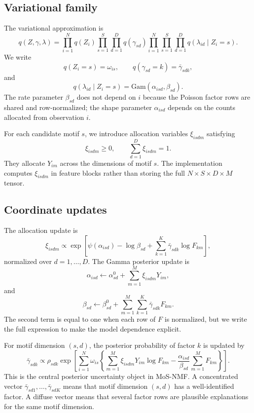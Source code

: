 \documentclass[11pt]{article}
\newcommand{\Gam}{\mathrm{Gam}}
\theoremstyle{definition}
\begin{document}
\subsection{Variational family}

The variational approximation is
\[
  q(Z,\gamma,\lambda)
  =
  \prod_{i=1}^N q(Z_i)
  \prod_{s=1}^S\prod_{d=1}^D q(\gamma_{sd})
  \prod_{i=1}^N\prod_{s=1}^S\prod_{d=1}^D
  q(\lambda_{id}\mid Z_i=s).
\]
We write
\[
  q(Z_i=s)=\omega_{is},
  \qquad
  q(\gamma_{sd}=k)=\bar{\gamma}_{sdk},
\]
and
\[
  q(\lambda_{id}\mid Z_i=s)
  =
  \Gam(\alpha_{isd},\beta_{sd}).
\]
The rate parameter $\beta_{sd}$ does not depend on $i$ because the Poisson
factor rows are shared and row-normalized; the shape parameter
$\alpha_{isd}$ depends on the counts allocated from observation $i$.

For each candidate motif $s$, we introduce allocation variables
$\xi_{isdm}$ satisfying
\[
  \xi_{isdm}\geq 0,
  \qquad
  \sum_{d=1}^D \xi_{isdm}=1.
\]
They allocate $Y_{im}$ across the dimensions of motif $s$. The implementation
computes $\xi_{isdm}$ in feature blocks rather than storing the full
$N\times S\times D\times M$ tensor.

\subsection{Coordinate updates}

The allocation update is
\[
  \xi_{isdm}
  \propto
  \exp\left[
    \psi(\alpha_{isd})-\log\beta_{sd}
    +
    \sum_{k=1}^K \bar{\gamma}_{sdk}\log F_{km}
  \right],
\]
normalized over $d=1,\ldots,D$. The Gamma posterior update is
\[
  \alpha_{isd}
  \leftarrow
  \alpha_{sd}^0+\sum_{m=1}^M \xi_{isdm}Y_{im},
\]
and
\[
  \beta_{sd}
  \leftarrow
  \beta_{sd}^0
  +
  \sum_{m=1}^M\sum_{k=1}^K \bar{\gamma}_{sdk}F_{km}.
\]
The second term is equal to one when each row of $F$ is normalized, but we
write the full expression to make the model dependence explicit.

For motif dimension $(s,d)$, the posterior probability of factor $k$ is updated by
\[
  \bar{\gamma}_{sdk}
  \propto
  \rho_{sdk}
  \exp\left[
    \sum_{i=1}^N \omega_{is}
    \left\{
      \sum_{m=1}^M \xi_{isdm}Y_{im}\log F_{km}
      -
      \frac{\alpha_{isd}}{\beta_{sd}}\sum_{m=1}^M F_{km}
    \right\}
  \right].
\]
This is the central posterior uncertainty object in MoS-NMF. A concentrated
vector $\bar{\gamma}_{sd1},\ldots,\bar{\gamma}_{sdK}$ means that motif dimension
$(s,d)$ has a well-identified factor. A diffuse vector means that several
factor rows are plausible explanations for the same motif dimension.
\end{document}
